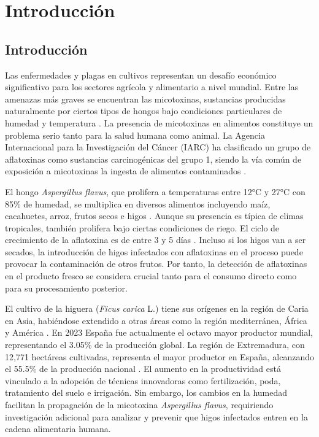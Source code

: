 \chapter{Introducción}
\section{Introducción}
Las enfermedades y plagas en cultivos representan un desafío económico significativo para los sectores agrícola y alimentario a nivel mundial. Entre las amenazas más graves se encuentran las micotoxinas, sustancias producidas naturalmente por ciertos tipos de hongos bajo condiciones particulares de humedad y temperatura \cite{KHAN2024e28361}. La presencia de micotoxinas en alimentos constituye un problema serio tanto para la salud humana como animal. La Agencia Internacional para la Investigación del Cáncer (IARC) ha clasificado un grupo de aflatoxinas como sustancias carcinogénicas del grupo 1, siendo la vía común de exposición a micotoxinas la ingesta de alimentos contaminados \cite{iarc2012aflatoxins}.

\vspace{5mm}

El hongo \textit{Aspergillus flavus}, que prolifera a temperaturas entre 12°C y 27°C con 85\% de humedad, se multiplica en diversos alimentos incluyendo maíz, cacahuetes, arroz, frutos secos e higos \cite{10.1093/fqsafe/fyz040}. Aunque su presencia es típica de climas tropicales, también prolifera bajo ciertas condiciones de riego. El ciclo de crecimiento de la aflatoxina es de entre 3 y 5 días \cite{Ahmad2025}. Incluso si los higos van a ser secados, la introducción de higos infectados con aflatoxinas en el proceso puede provocar la contaminación de otros frutos. Por tanto, la detección de aflatoxinas en el producto fresco se considera crucial tanto para el consumo directo como para su procesamiento posterior. 

\vspace{5mm}

El cultivo de la higuera (\textit{Ficus carica} L.) tiene sus orígenes en la región de Caria en Asia, habiéndose extendido a otras áreas como la región mediterránea, África y América \cite{cabicompendium.24078}. En 2023 España fue actualmente el octavo mayor productor mundial, representando el 3.05\% de la producción global. La región de Extremadura, con 12,771 hectáreas cultivadas, representa el mayor productor en España, alcanzando el 55.5\% de la producción nacional \cite{esyrce2023}. El aumento en la productividad está vinculado a la adopción de técnicas innovadoras como fertilización, poda, tratamiento del suelo e irrigación. Sin embargo, los cambios en la humedad facilitan la propagación de la micotoxina \textit{Aspergillus flavus}, requiriendo investigación adicional para analizar y prevenir que higos infectados entren en la cadena alimentaria humana.

